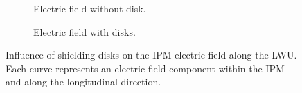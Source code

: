 \begin{figure}[!ht]
	\centering
	\begin{subfigure}[t]{0.7\textwidth}
		
		\caption[Electric field without disk]{Electric field without disk.}
		\label{chap3:no_disk}
	\end{subfigure}

	\begin{subfigure}[t]{0.7\textwidth}
		\centering
		
		\caption[Electric field with disks]{Electric field with disks.}
		\label{chap3:disks}
	\end{subfigure}
	\caption[Influence of shielding disks on the IPM electric field]{Influence of shielding disks on the IPM electric field along the LWU. Each curve represents an electric field component within the IPM and along the longitudinal direction.}
	\label{chap3:IPM_disk}
\end{figure}
